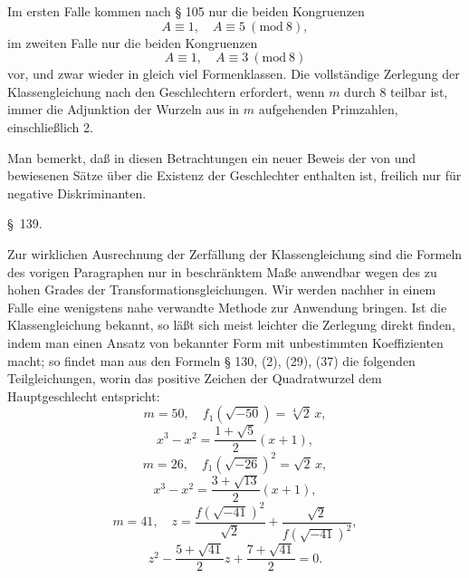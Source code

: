 Im ersten Falle kommen nach § 105 nur die beiden Kongruenzen
\[
A \equiv 1, \quad A \equiv 5\ (\mathrm{mod}\ 8),
\]
im zweiten Falle nur die beiden Kongruenzen
\[
A \equiv 1, \quad A \equiv 3\ (\mathrm{mod}\ 8)
\]
vor, und zwar wieder in gleich viel Formenklassen. Die vollständige Zerlegung der Klassengleichung nach den Geschlechtern erfordert, wenn $m$ durch 8 teilbar ist, immer die Adjunktion der Wurzeln aus  in $m$ aufgehenden Primzahlen, einschließlich 2.

Man bemerkt, daß in diesen Betrachtungen ein neuer Beweis der von  und  bewiesenen Sätze über die Existenz der Geschlechter enthalten ist, freilich nur für negative Diskriminanten.

\begin{center}
\S\ 139. 
\end{center}

Zur wirklichen Ausrechnung der Zerfällung der Klassengleichung sind die Formeln des vorigen Paragraphen nur in beschränktem Maße anwendbar wegen des zu hohen Grades der Transformationsgleichungen. Wir werden nachher in einem Falle eine wenigstens nahe verwandte Methode zur Anwendung bringen. Ist die Klassengleichung bekannt, so läßt sich meist leichter die Zerlegung direkt finden, indem man einen Ansatz von bekannter Form mit unbestimmten Koeffizienten macht; so findet man aus den Formeln § 130, (2), (29), (37) die folgenden Teilgleichungen, worin das positive Zeichen der Quadratwurzel dem Hauptgeschlecht entspricht:
\[
m = 50, \quad f_1\!\left(\sqrt{-50}\right) = \sqrt[4]{2}\, x,
\]
\[
x^3 - x^2 = \frac{1+\sqrt5}{2}(x+1),
\]
\[
m = 26, \quad f_1\!\left(\sqrt{-26}\right)^2 = \sqrt2\, x,
\]
\[
x^3 - x^2 = \frac{3+\sqrt{13}}{2}(x+1),
\]
\[
m = 41, \quad z = \frac{f\!\left(\sqrt{-41}\right)^2}{\sqrt2} + \frac{\sqrt2}{f\!\left(\sqrt{-41}\right)^2},
\]
\[
z^2 - \frac{5+\sqrt{41}}{2} z + \frac{7+\sqrt{41}}{2} = 0.
\]
